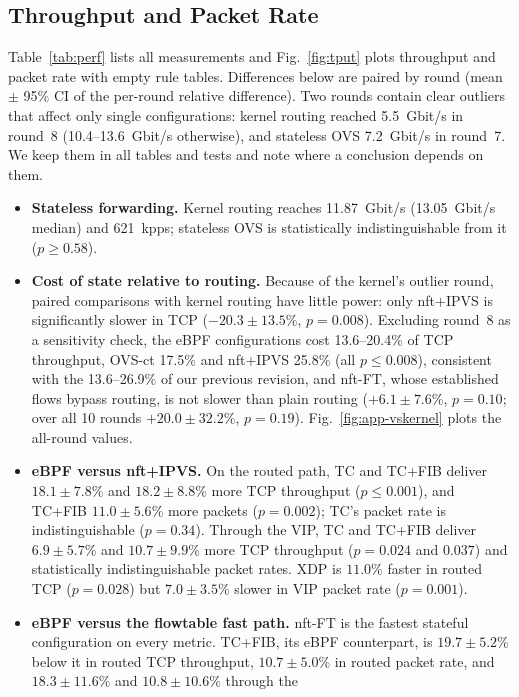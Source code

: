 \documentclass[conference]{IEEEtran}
\begin{document}
\subsection{Throughput and Packet Rate}
\label{sec:tput}
Table~\ref{tab:perf} lists all measurements and Fig.~\ref{fig:tput} plots
throughput and packet rate with empty rule tables. Differences below are
paired by round (mean $\pm$ 95\% CI of the per-round relative difference).
Two rounds contain clear outliers that affect only single configurations:
kernel routing reached 5.5~Gbit/s in round~8 (10.4--13.6~Gbit/s otherwise),
and stateless OVS 7.2~Gbit/s in round~7. We keep them in all tables and tests
and note where a conclusion depends on them.
\begin{itemize}
\item \textbf{Stateless forwarding.} Kernel routing reaches 11.87~Gbit/s
(13.05~Gbit/s median) and 621~kpps; stateless OVS is statistically
indistinguishable from it ($p \ge 0.58$).
\item \textbf{Cost of state relative to routing.} Because of the kernel's
outlier round, paired comparisons with kernel routing have little power: only
nft+IPVS is significantly slower in TCP ($-20.3 \pm 13.5\%$, $p=0.008$).
Excluding round~8 as a sensitivity check, the eBPF configurations cost
13.6--20.4\% of TCP throughput, OVS-ct 17.5\% and nft+IPVS 25.8\% (all
$p \le 0.008$), consistent with the 13.6--26.9\% of our previous revision,
and nft-FT, whose established flows bypass routing, is not slower than plain
routing ($+6.1 \pm 7.6\%$, $p=0.10$; over all 10 rounds $+20.0 \pm 32.2\%$,
$p=0.19$). Fig.~\ref{fig:app-vskernel} plots the all-round values.
\item \textbf{eBPF versus nft+IPVS.} On the routed path, TC and TC+FIB
deliver $18.1 \pm 7.8\%$ and $18.2 \pm 8.8\%$ more TCP throughput
($p \le 0.001$), and TC+FIB $11.0 \pm 5.6\%$ more packets ($p=0.002$); TC's
packet rate is indistinguishable ($p=0.34$). Through the VIP, TC and TC+FIB
deliver $6.9 \pm 5.7\%$ and $10.7 \pm 9.9\%$ more TCP throughput ($p=0.024$
and $0.037$) and statistically indistinguishable packet rates. XDP is
$11.0\%$ faster in routed TCP ($p=0.028$) but $7.0 \pm 3.5\%$ slower in VIP
packet rate ($p=0.001$).
\item \textbf{eBPF versus the flowtable fast path.} nft-FT is the fastest
stateful configuration on every metric. TC+FIB, its eBPF counterpart, is
$19.7 \pm 5.2\%$ below it in routed TCP throughput, $10.7 \pm 5.0\%$ in
routed packet rate, and $18.3 \pm 11.6\%$ and $10.8 \pm 10.6\%$ through the

\end{itemize}
\end{document}
